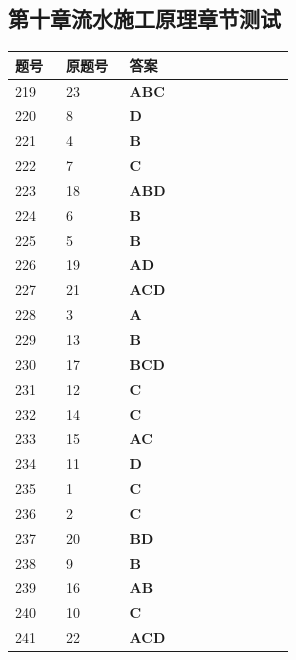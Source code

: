 \documentclass[UTF8,fontset=windows,11pt]{ctexart}
\begin{document}
\subsection*{第十章流水施工原理章节测试}
\begin{longtable}{p{0.16\linewidth}p{0.2\linewidth}p{0.52\linewidth}}
\textbf{\textcolor{examnavy}{题号}} & \textbf{\textcolor{examnavy}{原题号}} & \textbf{\textcolor{answergreen}{答案}} \\
\hline
219 & 23 & \textbf{\textcolor{answergreen}{ABC}} \\
220 & 8 & \textbf{\textcolor{answergreen}{D}} \\
221 & 4 & \textbf{\textcolor{answergreen}{B}} \\
222 & 7 & \textbf{\textcolor{answergreen}{C}} \\
223 & 18 & \textbf{\textcolor{answergreen}{ABD}} \\
224 & 6 & \textbf{\textcolor{answergreen}{B}} \\
225 & 5 & \textbf{\textcolor{answergreen}{B}} \\
226 & 19 & \textbf{\textcolor{answergreen}{AD}} \\
227 & 21 & \textbf{\textcolor{answergreen}{ACD}} \\
228 & 3 & \textbf{\textcolor{answergreen}{A}} \\
229 & 13 & \textbf{\textcolor{answergreen}{B}} \\
230 & 17 & \textbf{\textcolor{answergreen}{BCD}} \\
231 & 12 & \textbf{\textcolor{answergreen}{C}} \\
232 & 14 & \textbf{\textcolor{answergreen}{C}} \\
233 & 15 & \textbf{\textcolor{answergreen}{AC}} \\
234 & 11 & \textbf{\textcolor{answergreen}{D}} \\
235 & 1 & \textbf{\textcolor{answergreen}{C}} \\
236 & 2 & \textbf{\textcolor{answergreen}{C}} \\
237 & 20 & \textbf{\textcolor{answergreen}{BD}} \\
238 & 9 & \textbf{\textcolor{answergreen}{B}} \\
239 & 16 & \textbf{\textcolor{answergreen}{AB}} \\
240 & 10 & \textbf{\textcolor{answergreen}{C}} \\
241 & 22 & \textbf{\textcolor{answergreen}{ACD}} \\
\end{longtable}
\vspace{0.4em}
\end{document}
